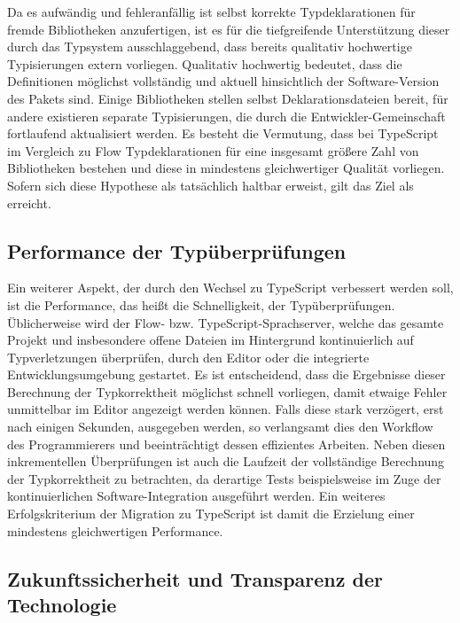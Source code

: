 Da es aufwändig und fehleranfällig ist selbst korrekte Typdeklarationen für fremde Bibliotheken anzufertigen, ist es für die tiefgreifende Unterstützung dieser durch das Typsystem ausschlaggebend, dass bereits qualitativ hochwertige Typisierungen extern vorliegen. Qualitativ hochwertig bedeutet, dass die Definitionen möglichst vollständig und aktuell hinsichtlich der Software-Version des Pakets sind. Einige Bibliotheken stellen selbst Deklarationsdateien bereit, für andere existieren separate Typisierungen, die durch die Entwickler-Gemeinschaft fortlaufend aktualisiert werden. Es besteht die Vermutung, dass bei TypeScript im Vergleich zu Flow Typdeklarationen für eine insgesamt größere Zahl von Bibliotheken bestehen und diese in mindestens gleichwertiger Qualität vorliegen. Sofern sich diese Hypothese als tatsächlich haltbar erweist, gilt das Ziel als erreicht.

\subsection{Performance der Typüberprüfungen}

Ein weiterer Aspekt, der durch den Wechsel zu TypeScript verbessert werden soll, ist die Performance, das heißt die Schnelligkeit, der Typüberprüfungen. Üblicherweise wird der Flow- bzw. TypeScript-Sprachserver, welche das gesamte Projekt und insbesondere offene Dateien im Hintergrund kontinuierlich auf Typverletzungen überprüfen, durch den Editor oder die integrierte Entwicklungsumgebung gestartet. Es ist entscheidend, dass die Ergebnisse dieser Berechnung der Typkorrektheit möglichst schnell vorliegen, damit etwaige Fehler unmittelbar im Editor angezeigt werden können. Falls diese stark verzögert, erst nach einigen Sekunden, ausgegeben werden, so verlangsamt dies den Workflow des Programmierers und beeinträchtigt dessen effizientes Arbeiten. Neben diesen inkrementellen Überprüfungen ist auch die Laufzeit der vollständige Berechnung der Typkorrektheit zu betrachten, da derartige Tests beispielsweise im Zuge der kontinuierlichen Software-Integration ausgeführt werden. Ein weiteres Erfolgskriterium der Migration zu TypeScript ist damit die Erzielung einer mindestens gleichwertigen Performance.

\subsection{Zukunftssicherheit und Transparenz der Technologie}
\label{sec:goal:transparency}

